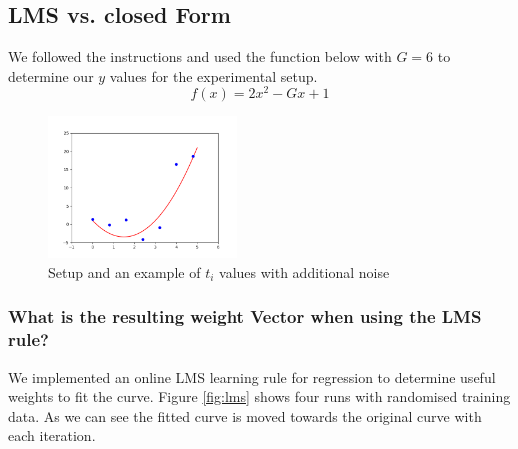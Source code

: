 \subsection{LMS vs. closed Form}
We followed the instructions and used the  function below with $G = 6$ to determine our $y$ values for the experimental setup.
\begin{equation}
f(x) = 2x^2 - Gx +1
\end{equation}


\begin{figure}[!h]
\begin{center}
\centering
\includegraphics[width=5cm]{setup.png}
\end{center}
\caption{ Setup and an example of $t_i$ values with additional noise}
\end{figure}

\subsubsection{What is the resulting weight Vector when using the LMS rule?}
We implemented an online LMS learning rule for regression to determine useful weights to fit the curve. Figure \ref{fig:lms} shows four runs with randomised training data. As we can see the fitted curve is moved towards the original curve with each iteration. 

